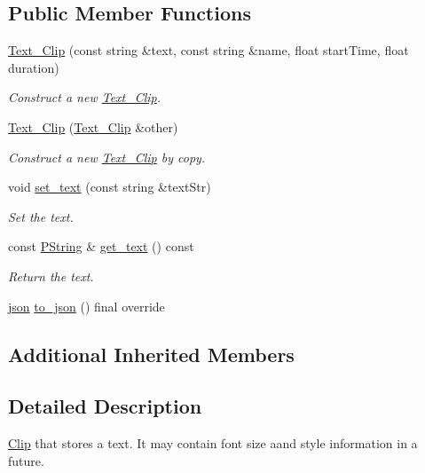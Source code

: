 \subsection*{Public Member Functions}
\begin{DoxyCompactItemize}
\item 
\mbox{\hyperlink{classprz_1_1_text___clip_a737a4d39a59cc1d2b80c92a36307f375}{Text\+\_\+\+Clip}} (const string \&text, const string \&name, float start\+Time, float duration)
\begin{DoxyCompactList}\small\item\em Construct a new \mbox{\hyperlink{classprz_1_1_text___clip}{Text\+\_\+\+Clip}}. \end{DoxyCompactList}\item 
\mbox{\hyperlink{classprz_1_1_text___clip_a0f6a6b80f74e6125be7ffeca1bf648fb}{Text\+\_\+\+Clip}} (\mbox{\hyperlink{classprz_1_1_text___clip}{Text\+\_\+\+Clip}} \&other)
\begin{DoxyCompactList}\small\item\em Construct a new \mbox{\hyperlink{classprz_1_1_text___clip}{Text\+\_\+\+Clip}} by copy. \end{DoxyCompactList}\item 
void \mbox{\hyperlink{classprz_1_1_text___clip_a202deb59702755d44bcec29fc7e69f8c}{set\+\_\+text}} (const string \&text\+Str)
\begin{DoxyCompactList}\small\item\em Set the text. \end{DoxyCompactList}\item 
const \mbox{\hyperlink{classprz_1_1_p_string}{P\+String}} \& \mbox{\hyperlink{classprz_1_1_text___clip_a9d7e0f330a7ced112c9e6acb6ec9f29d}{get\+\_\+text}} () const
\begin{DoxyCompactList}\small\item\em Return the text. \end{DoxyCompactList}\item 
\mbox{\hyperlink{namespaceprz_a2d8e9eeb62cf098759f1fff869da67f7}{json}} \mbox{\hyperlink{classprz_1_1_text___clip_a4e78e6e36c130ed42ec7f75772e3baed}{to\+\_\+json}} () final override
\end{DoxyCompactItemize}
\subsection*{Additional Inherited Members}


\subsection{Detailed Description}
\mbox{\hyperlink{classprz_1_1_clip}{Clip}} that stores a text. It may contain font size aand style information in a future. 



